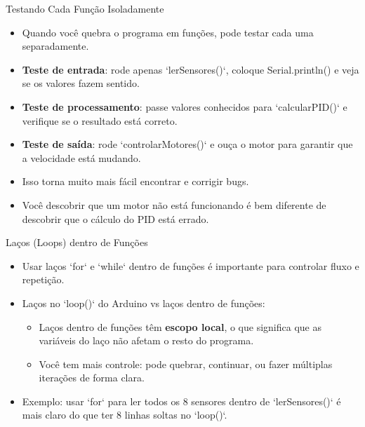 \documentclass[10pt]{beamer}
\begin{document}
\begin{frame}{Testando Cada Função Isoladamente}
  \begin{itemize}
    \item Quando você quebra o programa em funções, pode testar cada uma separadamente.
    \item \textbf{Teste de entrada}: rode apenas `lerSensores()`, coloque Serial.println() e veja se os valores fazem sentido.
    \item \textbf{Teste de processamento}: passe valores conhecidos para `calcularPID()` e verifique se o resultado está correto.
    \item \textbf{Teste de saída}: rode `controlarMotores()` e ouça o motor para garantir que a velocidade está mudando.
    \item Isso torna muito mais fácil encontrar e corrigir bugs.
    \item Você descobrir que um motor não está funcionando é bem diferente de descobrir que o cálculo do PID está errado.
  \end{itemize}
\end{frame}

\begin{frame}{Laços (Loops) dentro de Funções}
  \begin{itemize}
    \item Usar laços `for` e `while` dentro de funções é importante para controlar fluxo e repetição.
    \item Laços no `loop()` do Arduino vs laços dentro de funções:
    \begin{itemize}
      \item Laços dentro de funções têm \textbf{escopo local}, o que significa que as variáveis do laço não afetam o resto do programa.
      \item Você tem mais controle: pode quebrar, continuar, ou fazer múltiplas iterações de forma clara.
    \end{itemize}
    \item Exemplo: usar `for` para ler todos os 8 sensores dentro de `lerSensores()` é mais claro do que ter 8 linhas soltas no `loop()`.
  \end{itemize}
\end{frame}
\end{document}
